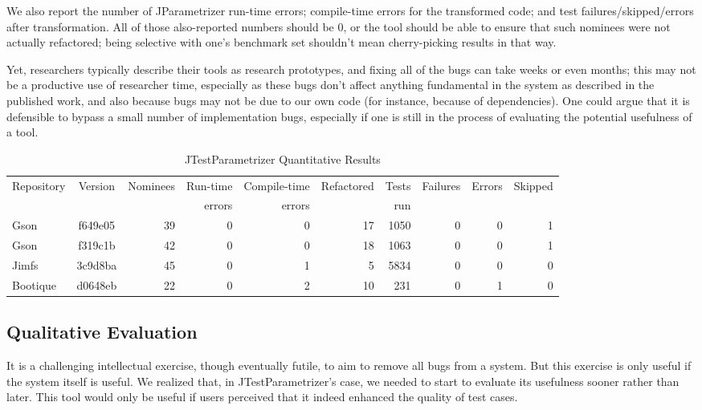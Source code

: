 We
also report the number of JParametrizer run-time errors; compile-time
errors for the transformed code; and test failures/skipped/errors
after transformation. All of those also-reported numbers should be 0, or the tool should be
able to ensure that such nominees were not actually refactored; being
selective with one's benchmark set shouldn't mean cherry-picking
results in that way. 

Yet, researchers typically describe their tools as research
prototypes, and fixing all of the bugs can take weeks or even months;
this may not be a productive use of researcher time, especially as
these bugs don't affect anything fundamental in the system as
described in the published work, and also because bugs may not be due
to our own code (for instance, because of dependencies).  One could
argue that it is defensible to bypass a small number of implementation
bugs, especially if one is still in the process of evaluating
the potential usefulness of a tool.

\begin{table*}[h!]
\centering
\begin{tabular}{l c r r r r r r r r} 
 Repository & Version & Nominees & Run-time  & Compile-time  & Refactored & Tests & Failures & Errors & Skipped \\
  &  &  & errors & errors &  & run &  &  &  \\ [0.75ex]
 \hline\hline
 Gson & f649e05 & 39 & 0 & 0 & 17 & 1050 & 0 & 0 & 1 \\ 
 Gson & f319c1b & 42 & 0 & 0 & 18 & 1063 & 0 & 0 & 1 \\ 
 Jimfs & 3c9d8ba & 45 & 0 & 1 & 5 & 5834 & 0 & 0 & 0 \\ 
 Bootique & d0648eb & 22 & 0 & 2 & 10 & 231 & 0 & 1 & 0 \\ 
\end{tabular}
\caption{JTestParametrizer Quantitative Results}
\label{table:quantitative_results}
\end{table*}

\subsection{Qualitative Evaluation}
It is a challenging intellectual exercise, though eventually futile,
to aim to remove all bugs from a system. But this exercise is only useful
if the system itself is useful. We realized that, in JTestParametrizer's
case, we needed to start to evaluate its usefulness sooner rather than later.
This tool would only be useful if users perceived that it indeed enhanced the
quality of test cases.


